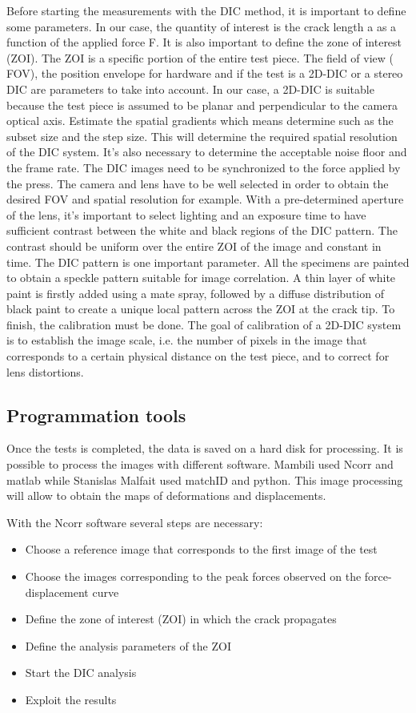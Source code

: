 Before starting the measurements with the DIC method, it is important to define some parameters. In our case, the quantity of interest is the crack length a as a function of the applied force F. It is also important to define the zone of interest (ZOI). The ZOI is a specific portion of the entire test piece. The field of view ( FOV), the position envelope for hardware and if the test is a 2D-DIC or a stereo DIC are parameters to take into account. In our case, a 2D-DIC is suitable because the test piece is assumed to be planar and perpendicular to the camera optical axis. Estimate the spatial gradients which means determine such as the subset size and the step size. This will determine the required spatial resolution of the DIC system. It’s also necessary to determine the acceptable noise floor and the frame rate. The DIC images need to be synchronized to the force applied by the press. The camera and lens have to be well selected in order to obtain the desired FOV and spatial resolution for example. With a pre-determined aperture of the lens, it’s important to select lighting and an exposure time to have sufficient contrast between the white and black regions of the DIC pattern. The contrast should be uniform over the entire ZOI of the image and constant in time. The DIC pattern is one important parameter. All the specimens are painted to obtain a speckle pattern suitable for image correlation. A thin layer of white paint is firstly added using a mate spray, followed by a diffuse distribution of black paint to create a unique local pattern across the ZOI at the crack tip. To finish, the calibration must be done. The goal of calibration of a 2D-DIC system is to establish the image scale, i.e. the number of pixels in the image that corresponds to a certain physical distance on the test piece, and to correct for lens distortions.

\subsection{Programmation tools}

Once the tests is completed, the data is saved on a hard disk for processing. It is possible to process the images with different software. Mambili used Ncorr and matlab while Stanislas Malfait used matchID and python. This image processing will allow to obtain the maps of deformations and displacements.

With the Ncorr software several steps are necessary:

\begin{itemize}
	\item Choose a reference image that corresponds to the first image of the test 
	\item Choose the images corresponding to the peak forces observed on the force-displacement curve
	\item Define the zone of interest (ZOI) in which the crack propagates
	\item Define the analysis parameters of the ZOI
	\item Start the DIC analysis
	\item Exploit the results
\end{itemize}

